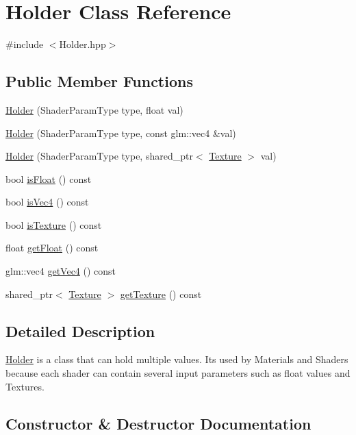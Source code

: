 \hypertarget{class_holder}{}\section{Holder Class Reference}
\label{class_holder}


{\ttfamily \#include $<$Holder.\+hpp$>$}

\subsection*{Public Member Functions}
\begin{DoxyCompactItemize}
\item 
\hyperlink{class_holder_ae1dbc8fe3c2767fc8151053f12d92153}{Holder} (Shader\+Param\+Type type, float val)
\item 
\hyperlink{class_holder_ac3b91f721b1215045a8844646475a6c6}{Holder} (Shader\+Param\+Type type, const glm\+::vec4 \&val)
\item 
\hyperlink{class_holder_a380c68c69ef301e3af33c0aca9a48e98}{Holder} (Shader\+Param\+Type type, shared\+\_\+ptr$<$ \hyperlink{class_texture}{Texture} $>$ val)
\item 
bool \hyperlink{class_holder_a2cd1439c60fb135001774ab4e655c43a}{is\+Float} () const 
\item 
bool \hyperlink{class_holder_a9d261d1a676d922c3b859e5fd67e8a22}{is\+Vec4} () const 
\item 
bool \hyperlink{class_holder_adec8ccaac7d8750aca659c7264ec32ac}{is\+Texture} () const 
\item 
float \hyperlink{class_holder_ad8c5e5b50c6a726f77343c339d5fd706}{get\+Float} () const 
\item 
glm\+::vec4 \hyperlink{class_holder_a66a04f0ba3f38c073afebc8154920d63}{get\+Vec4} () const 
\item 
shared\+\_\+ptr$<$ \hyperlink{class_texture}{Texture} $>$ \hyperlink{class_holder_a41425780f640866a40c069b298d3532d}{get\+Texture} () const 
\end{DoxyCompactItemize}


\subsection{Detailed Description}
\hyperlink{class_holder}{Holder} is a class that can hold multiple values. It\textquotesingle{}s used by Materials and Shaders because each shader can contain several input parameters such as float values and Textures. 

\subsection{Constructor \& Destructor Documentation}
\hypertarget{class_holder_ae1dbc8fe3c2767fc8151053f12d92153}{}
